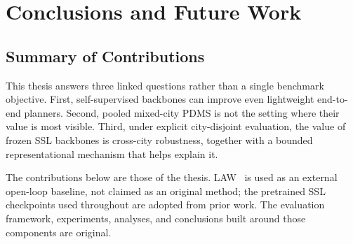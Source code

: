 \chapter{Conclusions and Future Work}
\label{chap:conclusions}

\section{Summary of Contributions}
\label{sec:concl-summary}

This thesis answers three linked questions rather than a single benchmark objective. First, self-supervised backbones can improve even lightweight end-to-end planners. Second, pooled mixed-city PDMS is not the setting where their value is most visible. Third, under explicit city-disjoint evaluation, the value of frozen SSL backbones is cross-city robustness, together with a bounded representational mechanism that helps explain it.

The contributions below are those of the thesis. LAW~\cite{li-law-2024} is used as an external open-loop baseline, not claimed as an original method; the pretrained SSL checkpoints used throughout are adopted from prior work. The evaluation framework, experiments, analyses, and conclusions built around those components are original.

